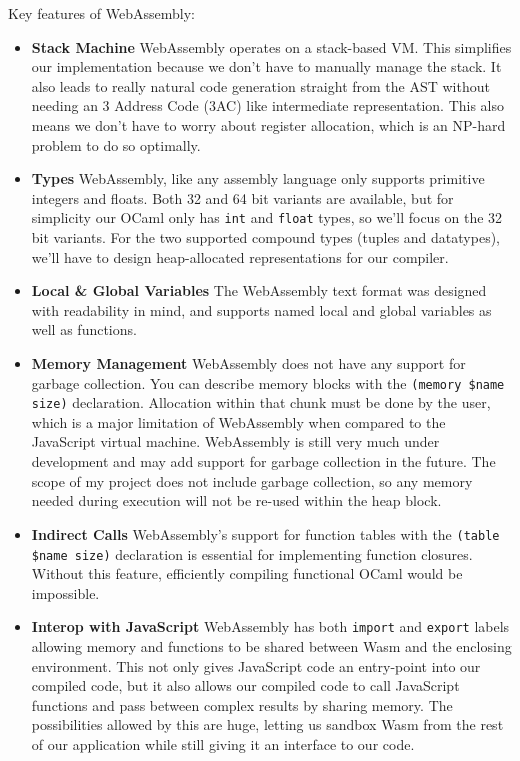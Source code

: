 \documentclass[12pt,a4paper,twoside,openright]{report}
\begin{document}
Key features of WebAssembly:
\begin{itemize}
   \item \textbf{Stack Machine}
      WebAssembly operates on a stack-based VM.
      This simplifies our implementation because we don't have to manually manage the stack.
      It also leads to really natural code generation straight from the AST without needing an 3 Address Code (3AC) like intermediate representation.
      This also means we don't have to worry about register allocation, which is an NP-hard problem to do so optimally.
   \item \textbf{Types}
      WebAssembly, like any assembly language only supports primitive integers and floats.
      Both 32 and 64 bit variants are available, but for simplicity our OCaml only has {\tt int}  and {\tt float} types, so we'll focus on the 32 bit variants.
      For the two supported compound types (tuples and datatypes), we'll have to design heap-allocated representations for our compiler.
   \item \textbf{Local \& Global Variables}
      The WebAssembly text format was designed with readability in mind, and supports named local and global variables as well as functions.
   \item \textbf{Memory Management}
      WebAssembly does not have any support for garbage collection.
      You can describe memory blocks with the {\tt (memory \$name size)} declaration.
      Allocation within that chunk must be done by the user, which is a major limitation of WebAssembly when compared to the JavaScript virtual machine.
      WebAssembly is still very much under development and may add support for garbage collection in the future.
      The scope of my project does not include garbage collection, so any memory needed during execution will not be re-used within the heap block.
   \item \textbf{Indirect Calls}
      WebAssembly's support for function tables with the {\tt (table \$name size)} declaration is essential for implementing function closures.
      Without this feature, efficiently compiling functional OCaml would be impossible.
   \item \textbf{Interop with JavaScript}
      WebAssembly has both {\tt import} and {\tt export} labels allowing memory and functions to be shared between Wasm and the enclosing environment.
      This not only gives JavaScript code an entry-point into our compiled code, but it also allows our compiled code to call JavaScript functions and pass between complex results by sharing memory.
      The possibilities allowed by this are huge, letting us sandbox Wasm from the rest of our application while still giving it an interface to our code.
\end{itemize}
\end{document}
